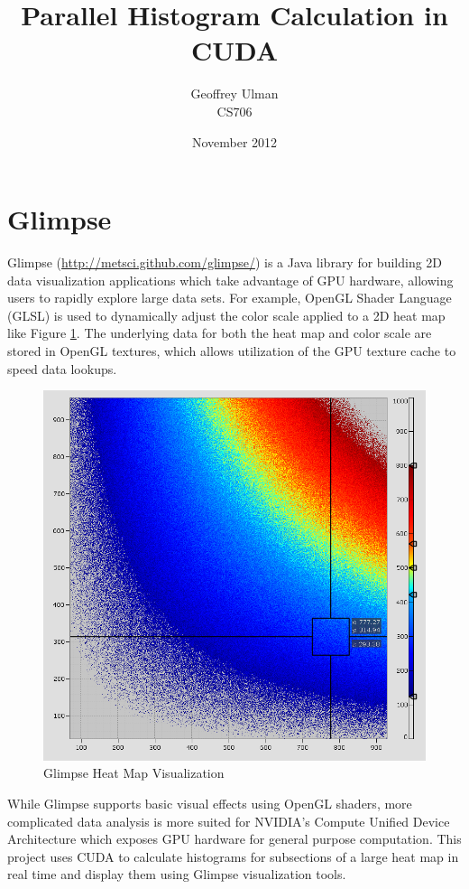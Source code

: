 \documentclass{article}
\begin{document}
\title{Parallel Histogram Calculation in CUDA}
\author{Geoffrey Ulman\\
        CS706}
\date{November 2012}
\maketitle

\section{Glimpse}\label{glimpse}

Glimpse (\url{http://metsci.github.com/glimpse/}) is a Java library for building 2D data visualization applications which take advantage of GPU hardware, allowing users to rapidly explore large data sets. For example, OpenGL Shader Language (GLSL) is used to dynamically adjust the color scale applied to a 2D heat map like Figure \ref{heatmap}. The underlying data for both the heat map and color scale are stored in OpenGL textures, which allows utilization of the GPU texture cache to speed data lookups.

\begin{figure}
\centering
\includegraphics[width=1.0\textwidth]{TaggedHeatMapExample.png}
\caption{Glimpse Heat Map Visualization\cite{glimpse.com}}
\label{heatmap}
\end{figure}

While Glimpse supports basic visual effects using OpenGL shaders, more complicated data analysis is more suited for NVIDIA's Compute Unified Device Architecture\cite{cuda-zone} which exposes GPU hardware for general purpose computation. This project uses CUDA to calculate histograms for subsections of a large heat map in real time and display them using Glimpse visualization tools.



\end{document}
